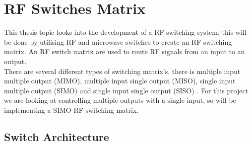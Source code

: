 \documentclass[12pt,openany,a4paper]{book}
\begin{document}
\section{RF Switches Matrix}
This thesis topic looks into the development of a RF switching system, this will be done by utilising RF and microwave switches to create an RF switching matrix. An RF switch matrix are used to route RF signals from an input to an output.\\
There are several different types of switching matrix's, there is multiple input multiple output (MIMO), multiple input single output (MISO), single input multiple output (SIMO) and single input single output (SISO) \cite{ref12}. For this project we are looking at controlling multiple outputs with a single input, so will be implementing a SIMO RF switching matrix.


\subsection{Switch Architecture}
\end{document}
